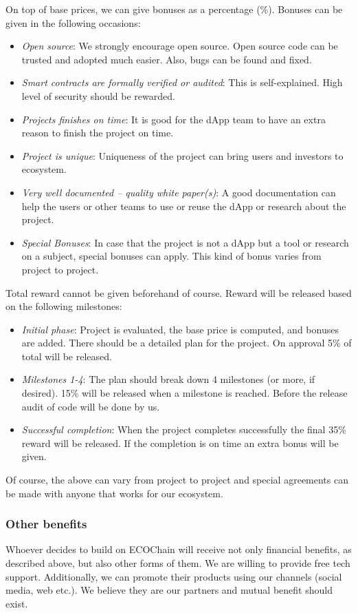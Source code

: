 \documentclass{article}
\begin{document}
On top of base prices, we can give bonuses as a percentage (\%). 
Bonuses can be given in the following occasions:
\begin{itemize}
\item \emph{Open source}: We strongly encourage open source. Open source code can be trusted and adopted much easier. Also, bugs can be found and fixed.
\item \emph{Smart contracts are formally verified or audited}: This is self-explained.  High level of security should be rewarded.
\item \emph{Projects finishes on time}: It is good for the dApp team to have an extra reason to finish the project on time.
\item \emph{Project is unique}: Uniqueness of the project can bring users and investors to ecosystem.
\item \emph{Very well documented – quality white paper(s)}: A good documentation can help the users or other teams to use or reuse the dApp or research about the project.
\item \emph{Special Bonuses}: In case that the project is not a dApp but a tool or research on a subject, special bonuses can apply. This kind of bonus varies from project to project.
\end{itemize}
Total reward cannot be given beforehand of course. Reward will be released based on the following milestones:
\begin{itemize}
\item \emph{Initial phase}: Project is evaluated, the base price is computed, and bonuses are added. There should be a detailed plan for the project. On approval 5\% of total will be released.
\item \emph{Milestones 1-4}: The plan should break down 4 milestones (or more, if desired). 15\% will be released when a milestone is reached. Before the release audit of code will be done by us.
\item \emph{Successful completion}: When the project completes successfully the final 35\% reward will be released. If the completion is on time an extra bonus will be given.
\end{itemize}
Of course, the above can vary from project to project and special agreements can be made with anyone that works for our ecosystem.

\subsubsection{Other benefits}
Whoever decides to build on ECOChain will receive not only financial benefits, as described above, but also other forms of them. We are willing to provide free tech support. Additionally, we can promote their products using our channels (social media, web etc.). We believe they are our partners and mutual benefit should exist.
\end{document}
